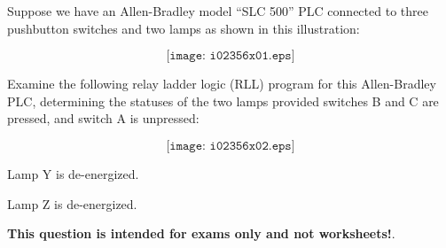 

Suppose we have an Allen-Bradley model ``SLC 500'' PLC connected to three pushbutton switches and two lamps as shown in this illustration:

$$\texttt{[image: i02356x01.eps]}$$

Examine the following relay ladder logic (RLL) program for this Allen-Bradley PLC, determining the statuses of the two lamps provided switches B and C are pressed, and switch A is unpressed:

$$\texttt{[image: i02356x02.eps]}$$







Lamp Y is de-energized.

\vskip 10pt

Lamp Z is de-energized.







{\bf This question is intended for exams only and not worksheets!}.



